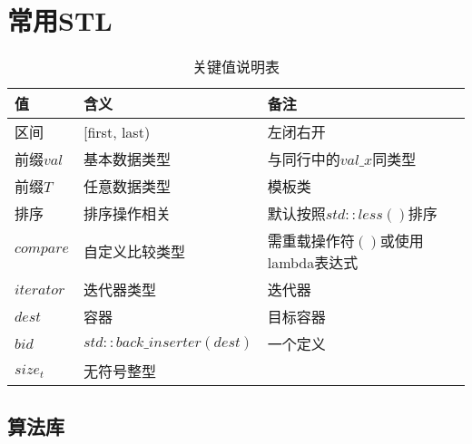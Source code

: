 \section{常用STL}

\begin{table}[htbp]
  \centering
  \caption{关键值说明表}
  \begin{tabularx}{\textwidth}{>{\raggedright\arraybackslash}X >{\centering\arraybackslash}X >{\raggedleft\arraybackslash}X}
    \toprule
    \rowcolor{headerbg}
    \textbf{值} & \textbf{含义} & \textbf{备注} \\
    \midrule
    区间 & [first, last) & 左闭右开 \\
    前缀$val$ & 基本数据类型 & 与同行中的$val\_x$同类型 \\
    前缀$T$ & 任意数据类型 & 模板类 \\
    排序 & 排序操作相关 & 默认按照$std::less()$排序 \\
    $compare$ & 自定义比较类型 & 需重载操作符$()$或使用lambda表达式 \\
    $iterator$ & 迭代器类型 & 迭代器 \\
    $dest$ & 容器 & 目标容器 \\
    $bid$ & $std::back\_inserter(dest)$ & 一个定义 \\
    $size_t$ & 无符号整型 & \\
    \bottomrule
  \end{tabularx}
\end{table}

\subsection{算法库}























